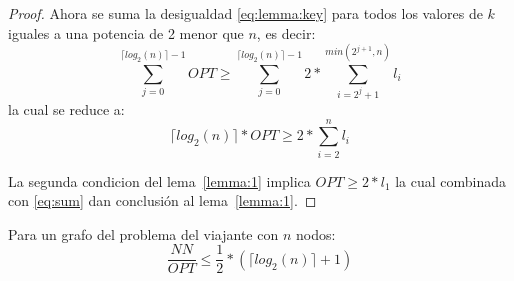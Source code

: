 \documentclass[spanish]{llncs}
\begin{document}
\begin{proof}
	Ahora se suma la desigualdad \eqref{eq:lemma:key} para todos los valores de $k$ iguales a
	una potencia de 2 menor que $n$, es decir:
	\begin{equation*}
		\sum_{j=0}^{\lceil log_2(n) \rceil - 1} OPT \ge \sum_{j=0}^{\lceil log_2(n) \rceil - 1} 2 * \sum_{i=2^j+1}^{min(2^{j+1},n)}l_i
	\end{equation*}
	la cual se reduce a:
	\begin{equation}
		\label{eq:sum}
		\lceil log_2(n) \rceil * OPT \ge 2*\sum_{i=2}^n l_i
	\end{equation}

	La segunda condicion del lema~\ref{lemma:1} implica $OPT \ge 2*l_1$
	la cual combinada con \eqref{eq:sum} dan conclusión al lema~\ref{lemma:1}.
\end{proof}

\begin{theorem}
	\label{theo:1}
	Para un grafo del problema del viajante con $n$ nodos:
	\begin{equation}
		\frac{NN}{OPT} \le \frac{1}{2}*(\lceil log_{2}(n) \rceil + 1)
	\end{equation}
\end{theorem}
\end{document}
